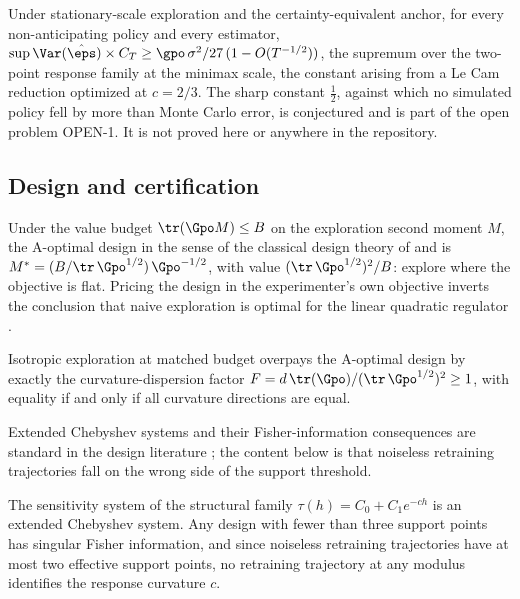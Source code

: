 \begin{theorem}
\label{thm:t4}
Under stationary-scale exploration and the certainty-equivalent anchor, for
every non-anticipating policy and every estimator,
$\sup \Var(\hat\eps)\times C_T \ge \gpo\,\sigma^2/27\,(1 - O(T^{-1/2}))$,
the supremum over the two-point response family at the minimax scale, the
constant arising from a Le Cam reduction optimized at $c = 2/3$. The sharp
constant $\tfrac{1}{2}$, against which no simulated policy fell by more than
Monte Carlo error, is conjectured and is part of the open problem OPEN-1. It
is not proved here or anywhere in the repository.
\end{theorem}

\subsection{Design and certification}

\begin{theorem}
\label{thm:t5a}
Under the value budget $\tr(\Gpo M) \le B$ on the exploration second moment
$M$, the A-optimal design in the sense of the classical design theory of
\citet{kiefer1960equivalence} and \citet{pukelsheim2006optimal} is
$M^{*} = (B/\tr\,\Gpo^{1/2})\,\Gpo^{-1/2}$, with value
$(\tr\,\Gpo^{1/2})^2/B$: explore where the objective is flat. Pricing the
design in the experimenter's own objective inverts the conclusion that naive
exploration is optimal for the linear quadratic regulator
\citep{simchowitz2020naive,wagenmaker2021task,dean2020sample}.
\end{theorem}

\begin{corollary}
\label{cor:c51}
Isotropic exploration at matched budget overpays the A-optimal design by
exactly the curvature-dispersion factor
$F = d\,\tr(\Gpo)/(\tr\,\Gpo^{1/2})^2 \ge 1$, with equality if and only if
all curvature directions are equal.
\end{corollary}

Extended Chebyshev systems and their Fisher-information consequences are
standard in the design literature \citep{pukelsheim2006optimal}; the content
below is that noiseless retraining trajectories fall on the wrong side of the
support threshold.

\begin{theorem}
\label{thm:t6}
The sensitivity system of the structural family
$\tau(h) = C_0 + C_1 e^{-ch}$ is an extended Chebyshev system. Any design
with fewer than three support points has singular Fisher information, and
since noiseless retraining trajectories have at most two effective support
points, no retraining trajectory at any modulus identifies the response
curvature $c$.
\end{theorem}

